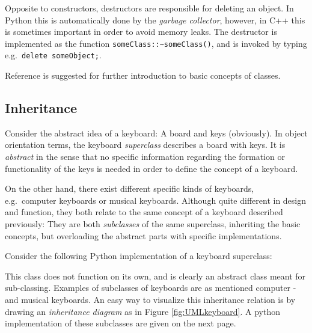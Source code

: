 Opposite to constructors, destructors are responsible for deleting an object. In Python this is automatically done by the \textit{garbage collector}, however, in C++ this is sometimes important in order to avoid memory leaks. The destructor is implemented as the function \verb+someClass::~someClass()+, and is invoked by typing e.g.~\verb+delete someObject;+.

Reference \cite{inf1100} is suggested for further introduction to basic concepts of classes.  

\subsection{Inheritance}

Consider the abstract idea of a keyboard: A board and keys (obviously). In object orientation terms, the keyboard \textit{superclass} describes a board with keys. It is \textit{abstract} in the sense that no specific information regarding the formation or functionality of the keys is needed in order to define the concept of a keyboard.

On the other hand, there exist different specific kinds of keyboards, e.g.~computer keyboards or musical keyboards. Although quite different in design and function, they both relate to the same concept of a keyboard described previously: They are both \textit{subclasses} of the same superclass, inheriting the basic concepts, but overloading the abstract parts with specific implementations. 

Consider the following Python implementation of a keyboard superclass:

\vspace{0.5cm}



This class does not function on its own, and is clearly an abstract class meant for sub-classing. Examples of subclasses of keyboards are as mentioned computer - and musical keyboards. An easy way to visualize this inheritance relation is by drawing an \textit{inheritance diagram} as in Figure \ref{fig:UMLkeyboard}. A python implementation of these subclasses are given on the next page. 

